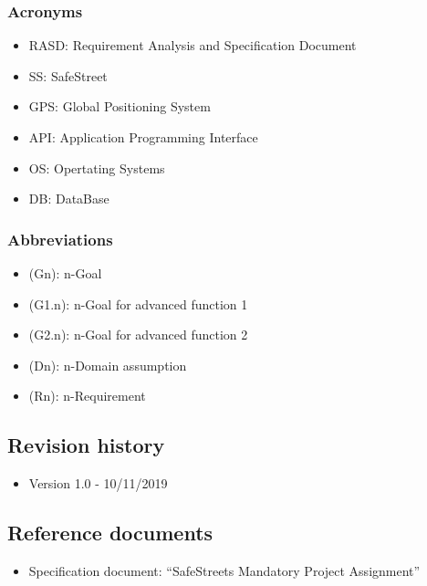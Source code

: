 \subsubsection{Acronyms}
\begin{itemize}
	\item RASD: Requirement Analysis and Specification Document
	\item SS: SafeStreet
	\item GPS: Global Positioning System
	\item API: Application Programming Interface
	\item OS: Opertating Systems
	\item DB: DataBase 
	\end{itemize}
\subsubsection{Abbreviations}
\begin{itemize}
	\item(Gn): n-Goal 
	\item(G1.n): n-Goal for advanced function 1 
	\item(G2.n): n-Goal for advanced function 2 
	\item(Dn): n-Domain assumption 
	\item(Rn): n-Requirement 
\end{itemize}
\subsection{Revision history}
\begin{itemize}
	\item Version 1.0 - 10/11/2019
\end{itemize}
\subsection{Reference documents}
\begin{itemize}
	\item Specification document: “SafeStreets Mandatory Project Assignment” 
\end{itemize}
